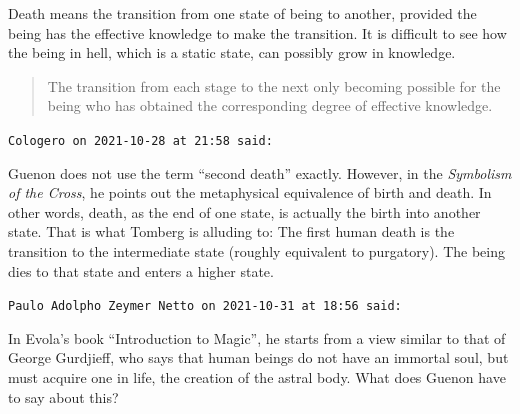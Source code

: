 \begin{footnotesize}
\begin{sffamily}
Death means the transition from one state of being to another, provided the being has the effective knowledge to make the transition. It is difficult to see how the being in hell, which is a static state, can possibly grow in knowledge.

\begin{quote}\small
The transition from each stage to the next only becoming possible for the being who has obtained the corresponding degree of effective knowledge.
\end{quote}


\hfill

\texttt{Cologero on 2021-10-28 at 21:58 said:}

Guenon does not use the term ``second death'' exactly. However, in the \emph{Symbolism of the Cross}, he points out the metaphysical equivalence of birth and death. In other words, death, as the end of one state, is actually the birth into another state. That is what Tomberg is alluding to: The first human death is the transition to the intermediate state (roughly equivalent to purgatory). The being dies to that state and enters a higher state.

\hfill

\texttt{Paulo Adolpho Zeymer Netto on 2021-10-31 at 18:56 said:}

In Evola's book ``Introduction to Magic'', he starts from a view similar to that of George Gurdjieff, who says that human beings do not have an immortal soul, but must acquire one in life, the creation of the astral body. What does Guenon have to say about this?

\hfill

\end{sffamily}
\end{footnotesize}

